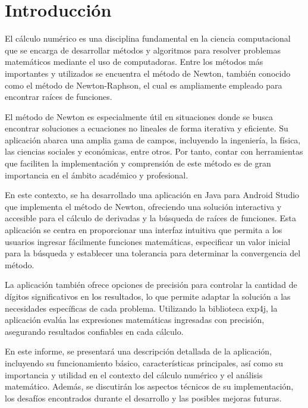 \documentclass[conference]{IEEEtran}
\begin{document}



\section{Introducción}

El cálculo numérico es una disciplina fundamental en la ciencia computacional que se encarga de desarrollar métodos y algoritmos para resolver problemas matemáticos mediante el uso de computadoras. Entre los métodos más importantes y utilizados se encuentra el método de Newton, también conocido como el método de Newton-Raphson, el cual es ampliamente empleado para encontrar raíces de funciones.

El método de Newton es especialmente útil en situaciones donde se busca encontrar soluciones a ecuaciones no lineales de forma iterativa y eficiente. Su aplicación abarca una amplia gama de campos, incluyendo la ingeniería, la física, las ciencias sociales y económicas, entre otros. Por tanto, contar con herramientas que faciliten la implementación y comprensión de este método es de gran importancia en el ámbito académico y profesional.

En este contexto, se ha desarrollado una aplicación en Java para Android Studio que implementa el método de Newton, ofreciendo una solución interactiva y accesible para el cálculo de derivadas y la búsqueda de raíces de funciones. Esta aplicación se centra en proporcionar una interfaz intuitiva que permita a los usuarios ingresar fácilmente funciones matemáticas, especificar un valor inicial para la búsqueda y establecer una tolerancia para determinar la convergencia del método.

La aplicación también ofrece opciones de precisión para controlar la cantidad de dígitos significativos en los resultados, lo que permite adaptar la solución a las necesidades específicas de cada problema. Utilizando la biblioteca exp4j, la aplicación evalúa las expresiones matemáticas ingresadas con precisión, asegurando resultados confiables en cada cálculo.

En este informe, se presentará una descripción detallada de la aplicación, incluyendo su funcionamiento básico, características principales, así como su importancia y utilidad en el contexto del cálculo numérico y el análisis matemático. Además, se discutirán los aspectos técnicos de su implementación, los desafíos encontrados durante el desarrollo y las posibles mejoras futuras.
\end{document}

